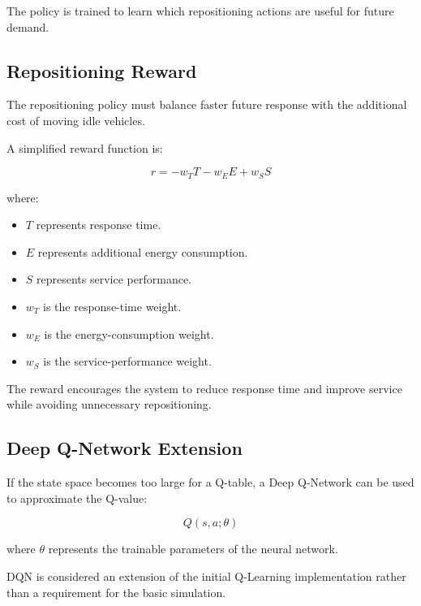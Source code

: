 \documentclass[12pt,a4paper]{article}
\begin{document}
The policy is trained to learn which repositioning actions are useful
for future demand.





\subsection{Repositioning Reward}

The repositioning policy must balance faster future response with
the additional cost of moving idle vehicles.

A simplified reward function is:

\begin{equation}
    r
    =
    -w_TT
    -
    w_EE
    +
    w_SS
    \label{eq:reward}
\end{equation}

where:

\begin{itemize}
    \item $T$ represents response time.
    \item $E$ represents additional energy consumption.
    \item $S$ represents service performance.
    \item $w_T$ is the response-time weight.
    \item $w_E$ is the energy-consumption weight.
    \item $w_S$ is the service-performance weight.
\end{itemize}

The reward encourages the system to reduce response time and improve
service while avoiding unnecessary repositioning.





\subsection{Deep Q-Network Extension}

If the state space becomes too large for a Q-table, a Deep Q-Network
can be used to approximate the Q-value:

\begin{equation}
    Q(s,a;\theta)
    \label{eq:dqn}
\end{equation}

where $\theta$ represents the trainable parameters of the neural
network.

DQN is considered an extension of the initial Q-Learning
implementation rather than a requirement for the basic simulation.
\end{document}
